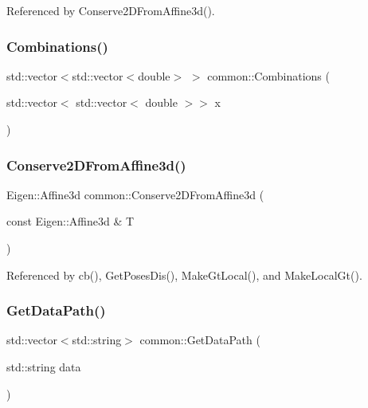 Referenced by Conserve2\+D\+From\+Affine3d().

\mbox{\label{namespacecommon_a064e9e4908dbc190a24e3b18635e3379}} 
\subsubsection{\texorpdfstring{Combinations()}{Combinations()}}
{\footnotesize\ttfamily std\+::vector$<$std\+::vector$<$double$>$ $>$ common\+::\+Combinations (\begin{DoxyParamCaption}\item[{std\+::vector$<$ std\+::vector$<$ double $>$$>$}]{x }\end{DoxyParamCaption})}

\mbox{\label{namespacecommon_ac1ecd24c73d1ded5d44eee957aa24b6d}} 
\subsubsection{\texorpdfstring{Conserve2\+D\+From\+Affine3d()}{Conserve2DFromAffine3d()}}
{\footnotesize\ttfamily Eigen\+::\+Affine3d common\+::\+Conserve2\+D\+From\+Affine3d (\begin{DoxyParamCaption}\item[{const Eigen\+::\+Affine3d \&}]{T }\end{DoxyParamCaption})}



Referenced by cb(), Get\+Poses\+Dis(), Make\+Gt\+Local(), and Make\+Local\+Gt().

\mbox{\label{namespacecommon_a7301dc27a588fd37f62232a7c1a86149}} 
\subsubsection{\texorpdfstring{Get\+Data\+Path()}{GetDataPath()}}
{\footnotesize\ttfamily std\+::vector$<$std\+::string$>$ common\+::\+Get\+Data\+Path (\begin{DoxyParamCaption}\item[{std\+::string}]{data }\end{DoxyParamCaption})}

